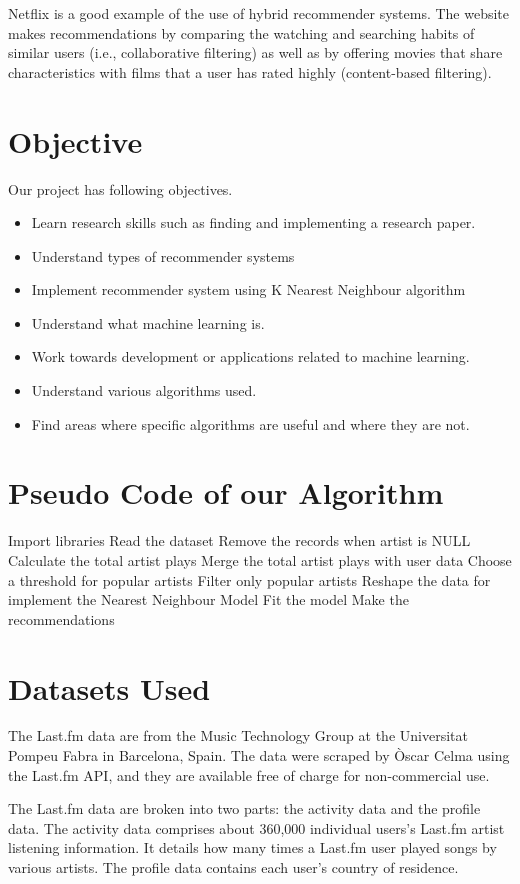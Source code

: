 \documentclass[paper=a4, fontsize=11pt]{scrartcl}
\numberwithin{equation}{section}		%
\numberwithin{figure}{section}			%
\numberwithin{table}{section}				%
\begin{document}
Netflix is a good example of the use of hybrid recommender systems. The website makes recommendations by comparing the watching and searching habits of similar users (i.e., collaborative filtering) as well as by offering movies that share characteristics with films that a user has rated highly (content-based filtering).

\section{Objective}
Our project has following objectives.
\begin{itemize}	
  \item Learn research skills such as finding and implementing a research paper.
  \item Understand types of recommender systems
  \item Implement recommender system using K Nearest Neighbour algorithm  
  \item Understand what machine learning is.
  \item Work towards development or applications related to machine learning.
  \item Understand various algorithms used.
  \item Find areas where specific algorithms are useful and where they are not.
\end{itemize}


\section{Pseudo Code of our Algorithm}
Import libraries
Read the dataset
Remove the records when artist is NULL
Calculate the total artist plays
Merge the total artist plays with user data
Choose a threshold for popular artists
Filter only popular artists
Reshape the data for implement the Nearest Neighbour Model 
Fit the model
Make the recommendations

\section{Datasets Used}

The Last.fm data are from the Music Technology Group at the Universitat Pompeu Fabra in Barcelona, Spain. The data were scraped by Òscar Celma using the Last.fm API, and they are available free of charge for non-commercial use.

The Last.fm data are broken into two parts: the activity data and the profile data. The activity data comprises about 360,000 individual users’s Last.fm artist listening information. It details how many times a Last.fm user played songs by various artists. The profile data contains each user’s country of residence.
\end{document}
